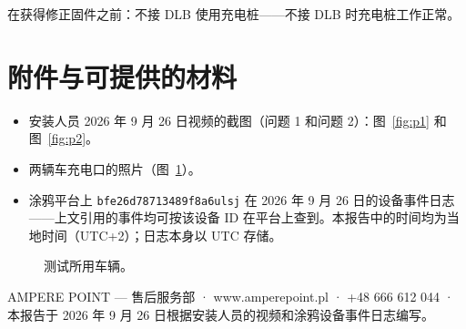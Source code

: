 \documentclass[11pt,a4paper]{article}
\begin{document}
\begin{apgreenb}[我们给客户的临时措施]
在获得修正固件之前：不接 DLB 使用充电桩——不接 DLB 时充电桩工作正常。
\end{apgreenb}

\section{附件与可提供的材料}

\begin{itemize}
\item 安装人员 2026 年 9 月 26 日视频的截图（问题 1 和问题 2）：图~\ref{fig:p1} 和图~\ref{fig:p2}。
\item 两辆车充电口的照片（图~\ref{fig:cars}）。
\item 涂鸦平台上 \texttt{bfe26d78713489f8a6ulsj} 在 2026 年 9 月 26 日的设备事件日志——上文引用的事件均可按该设备 ID 在平台上查到。本报告中的时间均为当地时间（UTC+2）；日志本身以 UTC 存储。
\end{itemize}

\begin{figure}[H]
\centering
{}\hspace{1.2cm}
\caption{测试所用车辆。}
\label{fig:cars}
\end{figure}

{\color{apmuted}\small AMPERE POINT — 售后服务部 · www.amperepoint.pl · +48 666 612 044 · 本报告于 2026 年 9 月 26 日根据安装人员的视频和涂鸦设备事件日志编写。}
\end{document}
